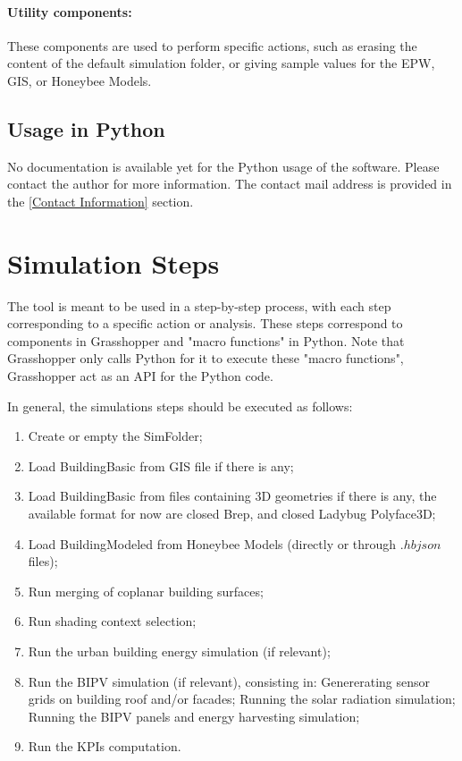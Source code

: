 \documentclass[a4paper,12pt]{article} %
\begin{document}
    \paragraph{Utility components:} These components are used to perform specific actions, such as erasing the content of the default simulation folder, or giving sample values for the EPW, GIS, or Honeybee Models.

    \subsection{Usage in Python}
    \label{subsec:usage-in-python}
    No documentation is available yet for the Python usage of the software.
    Please contact the author for more information.
    The contact mail address is provided in the \ref{Contact Information} section.

\section{Simulation Steps}
\label{sec:simulation-steps}
The tool is meant to be used in a step-by-step process, with each step corresponding to a specific action or analysis.
These steps correspond to components in Grasshopper and "macro functions" in Python.
Note that Grasshopper only calls Python for it to execute these "macro functions", Grasshopper act as an API for the Python code.

In general, the simulations steps should be executed as follows:
\begin{enumerate}
    \item Create or empty the \gls{SimFolder};
    \item Load \gls{BuildingBasic} from GIS file if there is any;
    \item Load \gls{BuildingBasic} from files containing 3D geometries if there is any, the available format for now are closed Brep, and closed Ladybug Polyface3D;
    \item Load \gls{BuildingModeled} from Honeybee Models (directly or through $.hbjson$ files);
    \item Run merging of coplanar building surfaces;
    \item Run shading context selection;
    \item Run the urban building energy simulation (if relevant);
    \item Run the BIPV simulation (if relevant), consisting in:
        \subitem Genererating sensor grids on building roof and/or facades;
        \subitem Running the solar radiation simulation;
        \subitem Running the BIPV panels and energy harvesting simulation;
    \item Run the KPIs computation.
\end{enumerate}
\end{document}
